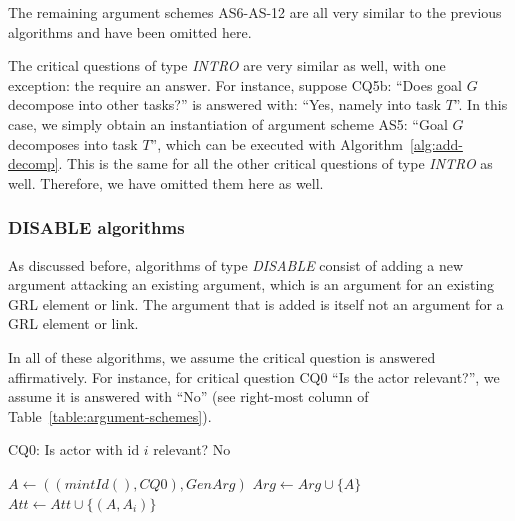 The remaining argument schemes AS6-AS-12 are all very similar to the previous algorithms and have been omitted here.

The critical questions of type \emph{INTRO} are very similar as well, with one exception: the require an answer. For instance, suppose CQ5b: ``Does goal $G$ decompose into other tasks?'' is answered with: ``Yes, namely into task $T$''. In this case, we simply obtain an instantiation of argument scheme AS5: ``Goal $G$ decomposes into task $T$'', which can be executed with Algorithm~\ref{alg:add-decomp}. This is the same for all the other critical questions of type \emph{INTRO} as well. Therefore, we have omitted them here as well.

\subsubsection{DISABLE algorithms}

As discussed before, algorithms of type \emph{DISABLE} consist of adding a new argument attacking an existing argument, which is an argument for an existing GRL element or link. The argument that is added is itself not an argument for a GRL element or link.

In all of these algorithms, we assume the critical question is answered affirmatively. For instance, for critical question CQ0 ``Is the actor relevant?'', we assume it is answered with ``No'' (see right-most column of Table~\ref{table:argument-schemes}).

\begin{algorithm}[h]
  \caption{CQ0: Is actor with id $i$ relevant? No}\label{alg:actor-not-relevant}
  \begin{algorithmic}[1]
    \State $A \leftarrow ((mintId(),CQ0),GenArg)$\label{alg:actor-not-relevant:genarg}
    \State $Arg\leftarrow Arg \cup \{A\}$\label{alg:actor-not-relevant:genarg2}
    \label{alg:actor-not-relevant:for}
      \State $Att \leftarrow Att \cup \{(A,A_i)\}$\label{alg:actor-not-relevant:att}
    \EndFor
    \EndProcedure
  \end{algorithmic}
\end{algorithm}

